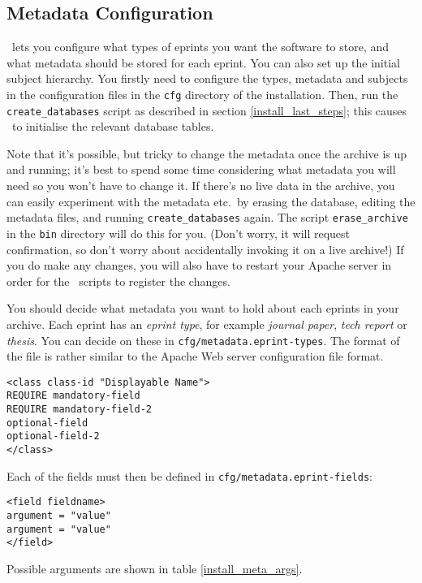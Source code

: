 \subsection{Metadata Configuration}
\label{install_metadata}

\eprints\ lets you configure what types of eprints you want the software to store, and what metadata should be stored for each eprint. You can also set up the initial subject hierarchy. You firstly need to configure the types, metadata and subjects in the configuration files in the {\tt cfg} directory of the installation. Then, run the {\tt create\_databases} script as described in section \ref{install_last_steps}; this causes \eprints\ to initialise the relevant database tables.

Note that it's possible, but tricky to change the metadata once the archive is up and running; it's best to spend some time considering what metadata you will need so you won't have to change it. If there's no live data in the archive, you can easily experiment with the metadata etc.\ by erasing the database, editing the metadata files, and running {\tt create\_databases} again. The script {\tt erase\_archive} in the {\tt bin} directory will do this for you. (Don't worry, it will request confirmation, so don't worry about accidentally invoking it on a live archive!) If you do make any changes, you will also have to restart your Apache server in order for the \eprints\ scripts to register the changes.

You should decide what metadata you want to hold about each eprints in your archive. Each eprint has an \emph{eprint type}, for example \emph{journal paper}, \emph{tech report} or \emph{thesis}. You can decide on these in {\tt cfg/metadata.eprint-types}. The format of the file is rather similar to the Apache Web server configuration file format.

\begin{verbatim}
<class class-id "Displayable Name">
REQUIRE mandatory-field
REQUIRE mandatory-field-2
optional-field
optional-field-2
</class>
\end{verbatim}

Each of the fields must then be defined in {\tt cfg/metadata.eprint-fields}:

\begin{verbatim}
<field fieldname>
argument = "value"
argument = "value"
</field>
\end{verbatim}

Possible arguments are shown in table \ref{install_meta_args}.

